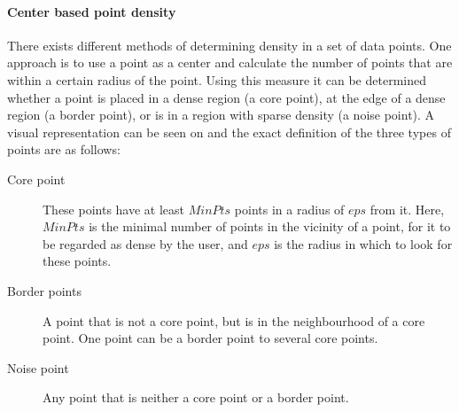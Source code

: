 \paragraph{Center based point density}
There exists different methods of determining density in a set of data points.
One approach is to use a point as a center and calculate the number of points that are within a certain radius of the point.
Using this measure it can be determined whether a point is placed in a dense region (a core point), at the edge of a dense region (a border point), or is in a region with sparse density (a noise point).
A visual representation can be seen on  and the exact definition of the three types of points are as follows\cite{pang2006introduction}:

\begin{description}
\item[Core point] These points have at least $ MinPts $ points in a radius of $ eps $ from it.
Here, $ MinPts $ is the minimal number of points in the vicinity of a point, for it to be regarded as dense by the user, and $ eps $ is the radius in which to look for these points.

\item[Border points] A point that is not a core point, but is in the neighbourhood of a core point. 
One point can be a border point to several core points.

\item[Noise point] Any point that is neither a core point or a border point. 
\end{description}

